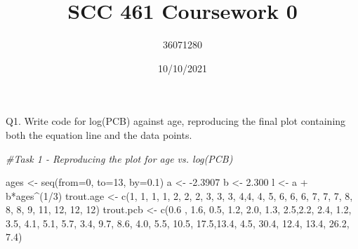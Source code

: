 \documentclass[
]{article}
\title{SCC 461 Coursework 0}
\author{36071280}
\date{10/10/2021}
\newenvironment{Shaded}{\begin{snugshade}}{\end{snugshade}}
\newcommand{\AttributeTok}[1]{\textcolor[rgb]{0.77,0.63,0.00}{#1}}
\newcommand{\CommentTok}[1]{\textcolor[rgb]{0.56,0.35,0.01}{\textit{#1}}}
\newcommand{\DecValTok}[1]{\textcolor[rgb]{0.00,0.00,0.81}{#1}}
\newcommand{\FloatTok}[1]{\textcolor[rgb]{0.00,0.00,0.81}{#1}}
\newcommand{\FunctionTok}[1]{\textcolor[rgb]{0.00,0.00,0.00}{#1}}
\newcommand{\NormalTok}[1]{#1}
\newcommand{\OtherTok}[1]{\textcolor[rgb]{0.56,0.35,0.01}{#1}}
\newcommand{\SpecialCharTok}[1]{\textcolor[rgb]{0.00,0.00,0.00}{#1}}
\begin{document}
\maketitle

Q1. Write code for log(PCB) against age, reproducing the final plot
containing both the equation line and the data points.

\begin{Shaded}
\begin{Highlighting}[]
\CommentTok{\#Task 1 {-} Reproducing the plot for age vs. log(PCB)}

\NormalTok{ages }\OtherTok{\textless{}{-}} \FunctionTok{seq}\NormalTok{(}\AttributeTok{from=}\DecValTok{0}\NormalTok{, }\AttributeTok{to=}\DecValTok{13}\NormalTok{, }\AttributeTok{by=}\FloatTok{0.1}\NormalTok{)}
\NormalTok{a }\OtherTok{\textless{}{-}} \SpecialCharTok{{-}}\FloatTok{2.3907}
\NormalTok{b }\OtherTok{\textless{}{-}} \FloatTok{2.300}
\NormalTok{l }\OtherTok{\textless{}{-}}\NormalTok{ a }\SpecialCharTok{+}\NormalTok{ b}\SpecialCharTok{*}\NormalTok{ages}\SpecialCharTok{\^{}}\NormalTok{(}\DecValTok{1}\SpecialCharTok{/}\DecValTok{3}\NormalTok{)}
\NormalTok{trout.age }\OtherTok{\textless{}{-}} \FunctionTok{c}\NormalTok{(}\DecValTok{1}\NormalTok{, }\DecValTok{1}\NormalTok{, }\DecValTok{1}\NormalTok{, }\DecValTok{1}\NormalTok{, }\DecValTok{2}\NormalTok{, }\DecValTok{2}\NormalTok{, }\DecValTok{2}\NormalTok{, }\DecValTok{3}\NormalTok{, }\DecValTok{3}\NormalTok{, }\DecValTok{3}\NormalTok{, }\DecValTok{4}\NormalTok{,}\DecValTok{4}\NormalTok{, }\DecValTok{4}\NormalTok{, }\DecValTok{5}\NormalTok{, }\DecValTok{6}\NormalTok{, }\DecValTok{6}\NormalTok{, }\DecValTok{6}\NormalTok{, }\DecValTok{7}\NormalTok{, }\DecValTok{7}\NormalTok{, }\DecValTok{7}\NormalTok{, }\DecValTok{8}\NormalTok{, }\DecValTok{8}\NormalTok{,}
               \DecValTok{8}\NormalTok{, }\DecValTok{9}\NormalTok{, }\DecValTok{11}\NormalTok{, }\DecValTok{12}\NormalTok{, }\DecValTok{12}\NormalTok{, }\DecValTok{12}\NormalTok{)}
\NormalTok{trout.pcb }\OtherTok{\textless{}{-}} \FunctionTok{c}\NormalTok{(}\FloatTok{0.6}\NormalTok{ , }\FloatTok{1.6}\NormalTok{, }\FloatTok{0.5}\NormalTok{, }\FloatTok{1.2}\NormalTok{, }\FloatTok{2.0}\NormalTok{, }\FloatTok{1.3}\NormalTok{, }\FloatTok{2.5}\NormalTok{,}\FloatTok{2.2}\NormalTok{, }\FloatTok{2.4}\NormalTok{, }\FloatTok{1.2}\NormalTok{, }\FloatTok{3.5}\NormalTok{, }\FloatTok{4.1}\NormalTok{, }\FloatTok{5.1}\NormalTok{, }\FloatTok{5.7}\NormalTok{,}
               \FloatTok{3.4}\NormalTok{, }\FloatTok{9.7}\NormalTok{, }\FloatTok{8.6}\NormalTok{, }\FloatTok{4.0}\NormalTok{, }\FloatTok{5.5}\NormalTok{, }\FloatTok{10.5}\NormalTok{, }\FloatTok{17.5}\NormalTok{,}\FloatTok{13.4}\NormalTok{, }\FloatTok{4.5}\NormalTok{, }\FloatTok{30.4}\NormalTok{, }\FloatTok{12.4}\NormalTok{, }\FloatTok{13.4}\NormalTok{, }\FloatTok{26.2}\NormalTok{, }\FloatTok{7.4}\NormalTok{)}

\end{Highlighting}
\end{Shaded}
\end{document}
